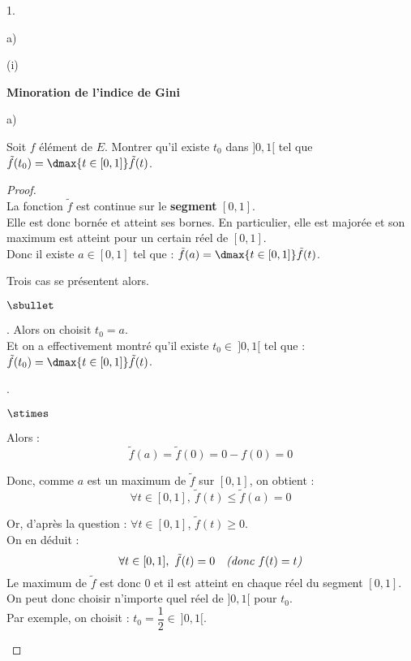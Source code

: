 \documentclass[11pt]{article}%
\begin{document}
\begin{noliste}{1.}
\begin{noliste}{a)}
\begin{nonoliste}{(i)}
  \end{nonoliste}
 \end{noliste}
 
 \item \textbf{Minoration de l'indice de Gini} 
 \begin{noliste}{a)}
  \item Soit $f$ élément de $E$. Montrer qu'il existe $t_0$ dans 
  $]0,1[$ tel que $\tilde{f}(t_0)= \dmax{t \in [0,1]} \tilde{f}(t)$. 
  
  \begin{proof}~\\
    La fonction $\tilde{f}$ est continue sur le {\bf segment} 
      $[0,1]$.\\
      Elle est donc bornée et atteint ses bornes. En particulier, elle
      est majorée et son maximum est atteint pour un certain réel 
      de $[0,1]$.\\
      Donc il existe $a \in [0,1]$ tel que : $\tilde{f}(a) = 
      \dmax{t\in [0,1]} \tilde{f}(t)$.
      
      
      \newpage
      
      
      Trois cas se présentent alors.
      \begin{noliste}{$\sbullet$}
      \item \dashuline{Si $a \in \ ]0,1[$}. Alors on choisit $t_0=a$.\\
      Et on a effectivement montré qu'il existe $t_0 \in \ ]0,1[$ tel 
      que : $\tilde{f}(t_0) = \dmax{t\in [0,1]}\tilde{f}(t)$.
      
      \item {}. 
      \begin{noliste}{$\stimes$}
      \item Alors :
      \[
        \tilde{f}(a) = \tilde{f}(0) = 0 - f(0)=0
      \]
      
      \item Donc, comme $a$ est un maximum de $\tilde{f}$ sur $[0,1]$,
      on obtient :
      \[
        \forall t\in [0,1], \ \tilde{f}(t) \leq \tilde{f}(a)=0
      \]
      
      \item Or, d'après la question  : $\forall t\in [0,1]$, 
      $\tilde{f}(t) \geq 0$.\\
      On en déduit : 
      \[
        \forall t \in [0,1], \ \tilde{f}(t) =0 \quad \text{\it (donc 
        $f(t)=t$)}
      \]
      Le maximum de $\tilde{f}$ est donc $0$ et il est atteint en 
      chaque réel du segment $[0,1]$.\\
      On peut donc choisir n'importe quel réel de $]0,1[$ pour $t_0$.\\ 
      Par exemple, on choisit : $t_0=\dfrac{1}{2} \in \ ]0,1[$.
      \end{noliste}
      

\end{noliste}
\end{proof}
\end{noliste}
\end{noliste}
\end{document}
